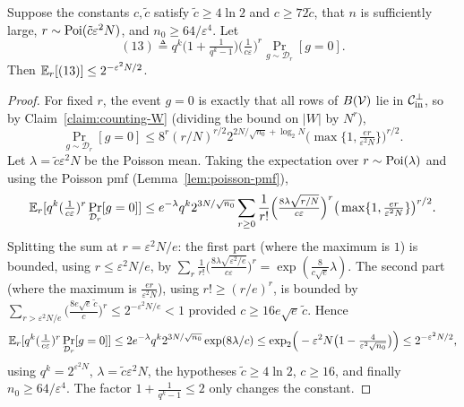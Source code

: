 \begin{lemma}[The $g = 0$ term is small, Claim 5.4]
  \label{claim:term13}
  Suppose the constants $c,\tilde c$ satisfy $\tilde c \geq 4\ln 2$ and
  $c \geq 72\tilde c$, that $n$ is sufficiently large, $r \sim \operatorname{Poi}(\tilde c
  \varepsilon^2 N)$, and $n_0 \geq 64/\varepsilon^4$. Let
  \[
    (13) \triangleq q^k\Big(1 + \tfrac{1}{q^k-1}\Big)
      \Big(\tfrac{1}{c\varepsilon}\Big)^r \Pr_{g\sim\mathcal{D}_r}[g = 0].
  \]
  Then $\mathbb{E}_r[(13)] \leq 2^{-\varepsilon^2 N/2}$.
\end{lemma}
\begin{proof}
  For fixed $r$, the event $g = 0$ is exactly that all rows of $B(\mathcal{V})$ lie in
  $\mathcal{C}_{\mathrm{in}}^\perp$, so by Claim~\ref{claim:counting-W} (dividing the bound on $|W|$
  by $N^r$),
  \[
    \Pr_{g\sim\mathcal{D}_r}[g=0] \leq 8^r(r/N)^{r/2}
      2^{2N/\sqrt{n_0}+\log_2 N}\big(\max\{1,\tfrac{er}{\varepsilon^2 N}\}\big)^{r/2}.
  \]
  Let $\lambda = \tilde c\varepsilon^2 N$ be the Poisson mean. Taking the
  expectation over $r \sim \operatorname{Poi}(\lambda)$ and using the Poisson pmf
  (Lemma~\ref{lem:poisson-pmf}),
  \[
    \mathbb{E}_r[q^k(\tfrac{1}{c\varepsilon})^r\Pr_{\mathcal{D}_r}[g=0]]
      \leq e^{-\lambda}q^k 2^{3N/\sqrt{n_0}}\sum_{r\geq 0}\frac{1}{r!}
      \Big(\tfrac{8\lambda\sqrt{r/N}}{c\varepsilon}\Big)^r
      \big(\max\{1,\tfrac{er}{\varepsilon^2 N}\}\big)^{r/2}.
  \]
  Splitting the sum at $r = \varepsilon^2 N/e$: the first part (where the maximum
  is $1$) is bounded, using $r \leq \varepsilon^2 N/e$, by
  $\sum_{r}\frac{1}{r!}\big(\frac{8\lambda\sqrt{\varepsilon^2/e}}{c\varepsilon}\big)^r
  = \exp(\frac{8}{c\sqrt e}\lambda)$. The second part (where the maximum is
  $\frac{er}{\varepsilon^2 N}$), using $r! \geq (r/e)^r$, is bounded by
  $\sum_{r > \varepsilon^2 N/e}\big(\frac{8e\sqrt e\,\tilde c}{c}\big)^r \leq
  2^{-\varepsilon^2 N/e} < 1$ provided $c \geq 16 e\sqrt e\,\tilde c$. Hence
  \[
    \mathbb{E}_r[q^k(\tfrac{1}{c\varepsilon})^r\Pr_{\mathcal{D}_r}[g=0]]
      \leq 2e^{-\lambda}q^k 2^{3N/\sqrt{n_0}}\exp(8\lambda/c)
      \leq \exp_2\!\Big(-\varepsilon^2 N\big(1 - \tfrac{4}{\varepsilon^2\sqrt{n_0}}\big)\Big)
      \leq 2^{-\varepsilon^2 N/2},
  \]
  using $q^k = 2^{\varepsilon^2 N}$, $\lambda = \tilde c\varepsilon^2 N$, the
  hypotheses $\tilde c \geq 4\ln 2$, $c \geq 16$, and finally
  $n_0 \geq 64/\varepsilon^4$. The factor $1 + \frac{1}{q^k-1}\leq 2$ only
  changes the constant.
\end{proof}

